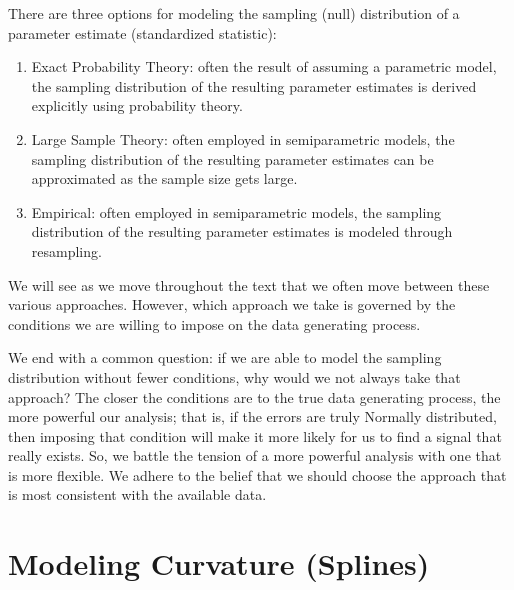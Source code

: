 \documentclass[
  letterpaper,
  DIV=11,
  numbers=noendperiod]{scrreprt}
\providecommand{\tightlist}{%
  \setlength{\itemsep}{0pt}\setlength{\parskip}{0pt}}\usepackage{longtable,booktabs,array}
\theoremstyle{definition}
\theoremstyle{definition}
\theoremstyle{remark}
\begin{document}
\begin{tcolorbox}[enhanced jigsaw, left=2mm, toprule=.15mm, arc=.35mm, breakable, opacitybacktitle=0.6, opacityback=0, rightrule=.15mm, colbacktitle=quarto-callout-tip-color!10!white, coltitle=black, leftrule=.75mm, toptitle=1mm, colframe=quarto-callout-tip-color-frame, titlerule=0mm, title=\textcolor{quarto-callout-tip-color}{\faLightbulb}\hspace{0.5em}{Big Idea}, bottomrule=.15mm, colback=white, bottomtitle=1mm]

There are three options for modeling the sampling (null) distribution of
a parameter estimate (standardized statistic):

\begin{enumerate}
\def\labelenumi{\arabic{enumi}.}
\tightlist
\item
  Exact Probability Theory: often the result of assuming a parametric
  model, the sampling distribution of the resulting parameter estimates
  is derived explicitly using probability theory.
\item
  Large Sample Theory: often employed in semiparametric models, the
  sampling distribution of the resulting parameter estimates can be
  approximated as the sample size gets large.
\item
  Empirical: often employed in semiparametric models, the sampling
  distribution of the resulting parameter estimates is modeled through
  resampling.
\end{enumerate}

\end{tcolorbox}

We will see as we move throughout the text that we often move between
these various approaches. However, which approach we take is governed by
the conditions we are willing to impose on the data generating process.

We end with a common question: if we are able to model the sampling
distribution without fewer conditions, why would we not always take that
approach? The closer the conditions are to the true data generating
process, the more powerful our analysis; that is, if the errors are
truly Normally distributed, then imposing that condition will make it
more likely for us to find a signal that really exists. So, we battle
the tension of a more powerful analysis with one that is more flexible.
We adhere to the belief that we should choose the approach that is most
consistent with the available data.

\hypertarget{sec-modeling-splines}{%
\chapter{Modeling Curvature (Splines)}\label{sec-modeling-splines}}
\end{document}
